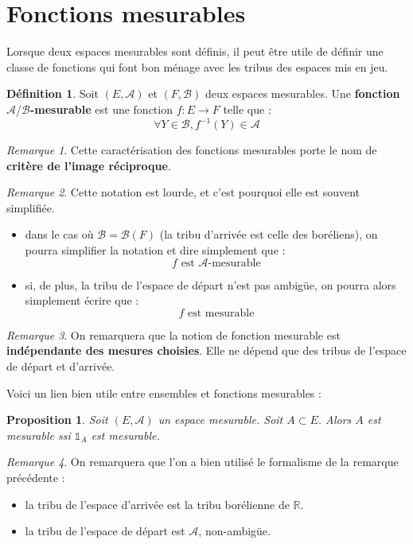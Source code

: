 \documentclass[french]{report}
\theoremstyle{plain}
\newtheorem{prop}{Proposition}[section]
\theoremstyle{definition}
\newtheorem{defi}{Définition}[section]
\theoremstyle{remark}
\newtheorem{rem}{Remarque}[section]
\newcommand\itemb{\item[$\bullet$]}
\begin{document}
\section{Fonctions mesurables}

Lorsque deux espaces mesurables sont définis, il peut être utile de définir une classe de fonctions qui font bon ménage avec les tribus des espaces mis en jeu.

\begin{defi}
  Soit $\left(E, \mathcal{A}\right)$ et $\left(F, \mathcal{B}\right)$ deux espaces mesurables.
  Une \textbf{fonction } $\mathcal{A}$/$\mathcal{B}$\textbf{-mesurable} est une fonction $f : E \longrightarrow F$ telle que :
  $$ \forall Y \in \mathcal{B}, f^{-1}(Y) \in \mathcal{A} $$
\end{defi}

\begin{rem}
  Cette caractérisation des fonctions mesurables porte le nom de \textbf{critère de l'image réciproque}.
\end{rem}

\begin{rem}
  Cette notation est lourde, et c'est pourquoi elle est souvent simplifiée.
  \begin{itemize}
  \itemb dans le cas où $\mathcal{B}=\mathcal{B}\left(F\right)$ (la tribu d'arrivée est celle des boréliens), on pourra simplifier la notation et dire simplement que :
  $$
  f \text{ est } \mathcal{A}\text{-mesurable}
  $$
  \itemb si, de plus, la tribu de l'espace de départ n'est pas ambigüe, on pourra alors simplement écrire que :
  $$
  f \text{ est mesurable}
  $$
  \end{itemize}
\end{rem}

\begin{rem}
  On remarquera que la notion de fonction mesurable est \textbf{indépendante des mesures choisies}.
  Elle ne dépend que des tribus de l'espace de départ et d'arrivée.
\end{rem}

Voici un lien bien utile entre ensembles et fonctions mesurables :

\begin{prop}
  \label{prop:lienensfctmes}
  Soit $\left(E, \mathcal{A}\right)$ un espace mesurable.
  Soit $A\subset E$.
  Alors $A$ est mesurable ssi $\mathds{1}_A$ est mesurable.
\end{prop}

\begin{rem}
  On remarquera que l'on a bien utilisé le formalisme de la remarque précédente :
  \begin{itemize}
    \itemb la tribu de l'espace d'arrivée est la tribu borélienne de $\mathbb{R}$.
    \itemb la tribu de l'espace de départ est $\mathcal{A}$, non-ambigüe.
  \end{itemize}
\end{rem}
\end{document}
